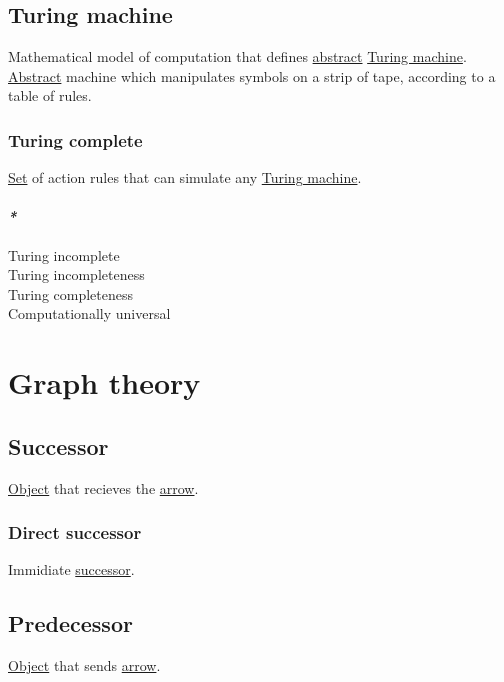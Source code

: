\documentclass[a4paper,14pt,oneside]{book}
\begin{document}
\section{\label{org2094b21}Turing machine}
\label{sec:orgdf12f47}
Mathematical model of computation that defines \hyperref[orgb942bc6]{abstract} \hyperref[org2094b21]{Turing machine}. \hyperref[orgb942bc6]{Abstract} machine which manipulates symbols on a strip of tape, according to a table of rules.\\

\subsection{\label{org8c47d6e}Turing complete}
\label{sec:org0229402}

\hyperref[org2ca93d9]{Set} of action rules that can simulate any \hyperref[org2094b21]{Turing machine}.\\

\subsubsection{\emph{*}}
\label{sec:orgcf90b09}

\label{org8a0bafd}Turing incomplete\\
\label{orgbdaa0dc}Turing incompleteness\\
\label{orgcad9624}Turing completeness\\
\label{org8ee1f98}Computationally universal\\

\chapter{\label{orgb90fe25}Graph theory}
\label{sec:orgf67e078}
\section{\label{org1bd73dc}Successor}
\label{sec:org18eb05c}
\hyperref[org920c789]{Object} that recieves the \hyperref[org6d9e214]{arrow}.\\

\subsection{\label{orgf9216ee}Direct successor}
\label{sec:orgc8af41c}
Immidiate \hyperref[org1bd73dc]{successor}.\\

\section{\label{org2f4e94a}Predecessor}
\label{sec:org4a65815}
\hyperref[org920c789]{Object} that sends \hyperref[org6d9e214]{arrow}.\\
\end{document}
